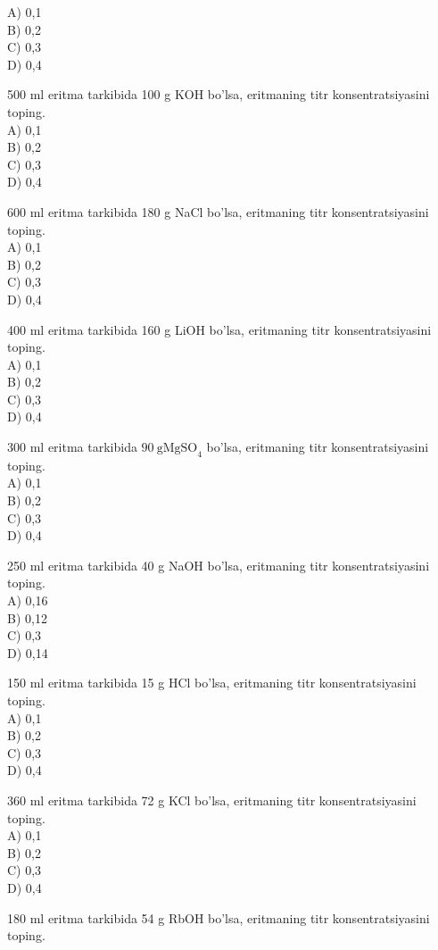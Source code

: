 A) 0,1\\
B) 0,2\\
C) 0,3\\
D) 0,4
  \item 500 ml eritma tarkibida 100 g KOH bo'lsa, eritmaning titr konsentratsiyasini toping.\\
A) 0,1\\
B) 0,2\\
C) 0,3\\
D) 0,4
  \item 600 ml eritma tarkibida 180 g NaCl bo'lsa, eritmaning titr konsentratsiyasini toping.\\
A) 0,1\\
B) 0,2\\
C) 0,3\\
D) 0,4
  \item 400 ml eritma tarkibida 160 g LiOH bo'lsa, eritmaning titr konsentratsiyasini toping.\\
A) 0,1\\
B) 0,2\\
C) 0,3\\
D) 0,4
  \item 300 ml eritma tarkibida $90 \mathrm{~g} \mathrm{MgSO}_{4}$ bo'lsa, eritmaning titr konsentratsiyasini toping.\\
A) 0,1\\
B) 0,2\\
C) 0,3\\
D) 0,4
  \item 250 ml eritma tarkibida 40 g NaOH bo'lsa, eritmaning titr konsentratsiyasini toping.\\
A) 0,16\\
B) 0,12\\
C) 0,3\\
D) 0,14
  \item 150 ml eritma tarkibida 15 g HCl bo'lsa, eritmaning titr konsentratsiyasini toping.\\
A) 0,1\\
B) 0,2\\
C) 0,3\\
D) 0,4
  \item 360 ml eritma tarkibida 72 g KCl bo'lsa, eritmaning titr konsentratsiyasini toping.\\
A) 0,1\\
B) 0,2\\
C) 0,3\\
D) 0,4
  \item 180 ml eritma tarkibida 54 g RbOH bo'lsa, eritmaning titr konsentratsiyasini toping.\\
